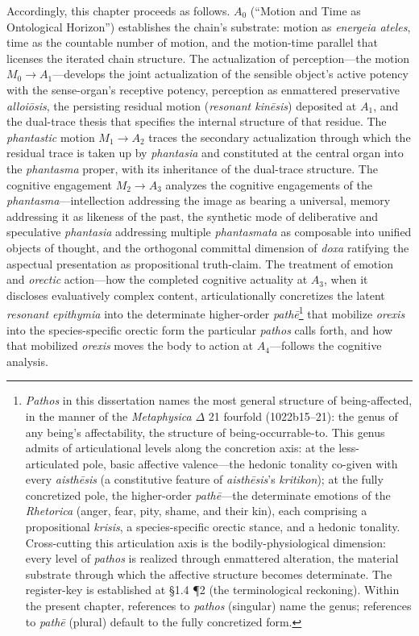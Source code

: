 \documentclass{article}
\begin{document}
Accordingly, this chapter proceeds as follows. $A_0$ (``Motion and Time as Ontological Horizon'') establishes the chain's substrate: motion as \textit{energeia ateles}, time as the countable number of motion, and the motion-time parallel that licenses the iterated chain structure. The actualization of perception---the motion $M_0 \rightarrow A_1$---develops the joint actualization of the sensible object's active potency with the sense-organ's receptive potency, perception as enmattered preservative \textit{alloiōsis}, the persisting residual motion (\textit{resonant kinēsis}) deposited at $A_1$, and the dual-trace thesis that specifies the internal structure of that residue. The \textit{phantastic} motion $M_1 \rightarrow A_2$ traces the secondary actualization through which the residual trace is taken up by \textit{phantasia} and constituted at the central organ into the \textit{phantasma} proper, with its inheritance of the dual-trace structure. The cognitive engagement $M_2 \rightarrow A_3$ analyzes the cognitive engagements of the \textit{phantasma}---intellection addressing the image as bearing a universal, memory addressing it as likeness of the past, the synthetic mode of deliberative and speculative \textit{phantasia} addressing multiple \textit{phantasmata} as composable into unified objects of thought, and the orthogonal committal dimension of \textit{doxa} ratifying the aspectual presentation as propositional truth-claim. The treatment of emotion and \textit{orectic} action---how the completed cognitive actuality at $A_3$, when it discloses evaluatively complex content, articulationally concretizes the latent \textit{resonant epithymia} into the determinate higher-order \textit{pathē}\footnote{\textit{Pathos} in this dissertation names the most general structure of being-affected, in the manner of the \textit{Metaphysica} $\Delta$ 21 fourfold (1022b15--21): the genus of any being's affectability, the structure of being-occurrable-to. This genus admits of articulational levels along the concretion axis: at the less-articulated pole, basic affective valence---the hedonic tonality co-given with every \textit{aisthēsis} (a constitutive feature of \textit{aisthēsis}'s \textit{kritikon}); at the fully concretized pole, the higher-order \textit{pathē}---the determinate emotions of the \textit{Rhetorica} (anger, fear, pity, shame, and their kin), each comprising a propositional \textit{krisis}, a species-specific orectic stance, and a hedonic tonality. Cross-cutting this articulation axis is the bodily-physiological dimension: every level of \textit{pathos} is realized through enmattered alteration, the material substrate through which the affective structure becomes determinate. The register-key is established at \S1.4 \P2 (the terminological reckoning). Within the present chapter, references to \textit{pathos} (singular) name the genus; references to \textit{pathē} (plural) default to the fully concretized form.} that mobilize \textit{orexis} into the species-specific orectic form the particular \textit{pathos} calls forth, and how that mobilized \textit{orexis} moves the body to action at $A_4$---follows the cognitive analysis.
\end{document}
